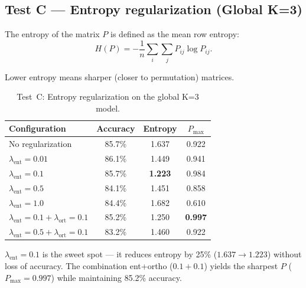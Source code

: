 \subsection{Test C --- Entropy regularization (Global K=3)}

The entropy of the matrix $P$ is defined as the mean row entropy:
\begin{equation}
H(P) = -\frac{1}{n}\sum_i \sum_j P_{ij} \log P_{ij}.
\end{equation}

Lower entropy means sharper (closer to permutation) matrices.

\begin{table}[h]
\centering
\caption{Test~C: Entropy regularization on the global K=3 model.}
\begin{tabular}{lccc}
\hline
\textbf{Configuration} & \textbf{Accuracy} & \textbf{Entropy} & $P_{\max}$ \\
\hline
No regularization & 85.7\% & 1.637 & 0.922 \\
$\lambda_{\text{ent}} = 0.01$ & 86.1\% & 1.449 & 0.941 \\
$\lambda_{\text{ent}} = 0.1$ & 85.7\% & \textbf{1.223} & 0.984 \\
$\lambda_{\text{ent}} = 0.5$ & 84.1\% & 1.451 & 0.858 \\
$\lambda_{\text{ent}} = 1.0$ & 84.4\% & 1.682 & 0.610 \\
$\lambda_{\text{ent}}=0.1 + \lambda_{\text{ort}}=0.1$ & 85.2\% & 1.250 & \textbf{0.997} \\
$\lambda_{\text{ent}}=0.5 + \lambda_{\text{ort}}=0.1$ & 83.2\% & 1.460 & 0.922 \\
\hline
\end{tabular}
\end{table}

$\lambda_{\text{ent}}=0.1$ is the sweet spot --- it reduces entropy by 25\% ($1.637 \to 1.223$) without loss of accuracy. The combination ent+ortho ($0.1+0.1$) yields the sharpest $P$ ($P_{\max}=0.997$) while maintaining 85.2\% accuracy.
